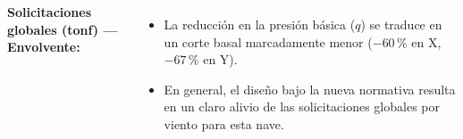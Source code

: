 \documentclass[11.5pt,aspectratio=169,handout]{beamer}
\begin{document}
\begin{frame}
\begin{columns}[T,totalwidth=\textwidth]
  \vspace{-1mm}
  {\footnotesize\textbf{Solicitaciones globales (tonf) --- Envolvente:}}\\[2mm]
  \\[3mm]
  \begin{itemize}\scriptsize\setlength{\itemsep}{2mm}
    \item La reducción en la presión básica ($q$) se traduce en un \alert{corte basal marcadamente menor} ($-60\,\text{\%}$ en X, $-67\,\text{\%}$ en Y).
    \item En general, el diseño bajo la nueva normativa resulta en un claro \alert{alivio} de las solicitaciones globales por viento para esta nave.
  \end{itemize}
\end{columns}
\end{frame}
\end{document}
